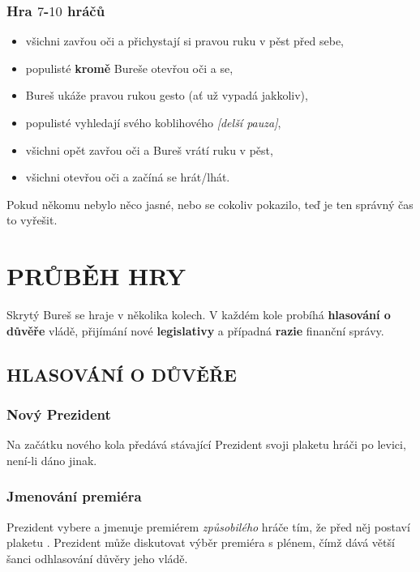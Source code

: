 \documentclass{article}
\begin{document}
    \subsubsection*{Hra $7$-$10$ hráčů}
    \begin{itemize}
        \item všichni zavřou oči a přichystají si pravou ruku v pěst před sebe,
        \item populisté \textbf{kromě} Bureše otevřou oči a  se,
        \item Bureš ukáže pravou rukou gesto  (ať už vypadá jakkoliv),
        \item populisté vyhledají svého koblihového {\it [delší pauza]},
        \item všichni opět zavřou oči a Bureš vrátí ruku v pěst,
        \item všichni otevřou oči a začíná se hrát/lhát.
    \end{itemize}
    Pokud někomu nebylo něco jasné, nebo se cokoliv pokazilo, teď je ten správný čas to vyřešit. %


\section*{PRŮBĚH HRY}

    Skrytý Bureš se hraje v několika kolech. V každém kole probíhá \textbf{hlasování o důvěře} vládě, přijímání nové \textbf{legislativy} a případná \textbf{razie} finanční správy. %

    \subsection*{HLASOVÁNÍ O DŮVĚŘE}

        \subsubsection{Nový Prezident}

            Na začátku nového kola předává stávající Prezident svoji plaketu hráči po levici, není-li dáno jinak.

        \subsubsection{Jmenování premiéra}

            Prezident vybere a jmenuje premiérem {\it způ\-so\-bi\-lé\-ho} hráče tím, že před něj postaví plaketu . Prezident může diskutovat výběr premiéra s plénem, čímž dává větší šanci odhlasování důvěry jeho vládě.
\end{document}
